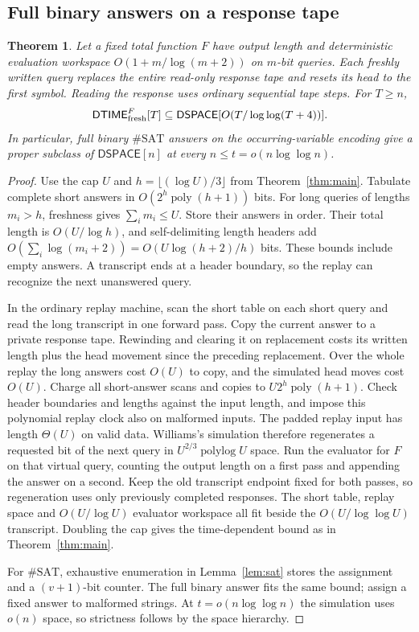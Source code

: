 \documentclass[11pt]{article}
\newtheorem{theorem}{Theorem}[section]
\theoremstyle{remark}
\newcommand{\DTIME}{\mathsf{DTIME}}
\newcommand{\DSPACE}{\mathsf{DSPACE}}
\begin{document}
\subsection{Full binary answers on a response tape}\label{sec:full-answers}
\begin{theorem}\label{thm:full-answers}
Let a fixed total function $F$ have output length and deterministic
evaluation workspace $O(1+m/\log(m+2))$ on $m$-bit queries.
Each freshly written query replaces the entire read-only response
tape and resets its head to the first symbol. Reading the response
uses ordinary sequential tape steps. For $T\ge n$,
\[
 \DTIME_{\rm fresh}^{F}[T]\subseteq
 \DSPACE[O(T/\log\log(T+4))].
\]
In particular, full binary $\#\mathrm{SAT}$ answers on the
occurring-variable encoding give a proper subclass of $\DSPACE[n]$
at every $n\le t=o(n\log\log n)$.
\end{theorem}
\begin{proof}
Use the cap $U$ and $h=\lfloor(\log U)/3\rfloor$ from
Theorem~\ref{thm:main}. Tabulate complete short answers in
$O(2^h\operatorname{poly}(h+1))$ bits. For long queries of lengths
$m_i>h$, freshness gives $\sum_i m_i\le U$. Store their answers
in order. Their total length is $O(U/\log h)$, and self-delimiting
length headers add $O(\sum_i\log(m_i+2))=O(U\log(h+2)/h)$ bits.
These bounds include empty answers. A transcript ends at a header
boundary, so the replay can recognize the next unanswered query.

In the ordinary replay machine, scan the short table on each short
query and read the long transcript in one forward pass. Copy the
current answer to a private response tape. Rewinding and clearing
it on replacement costs its written length plus the head movement
since the preceding replacement. Over the whole replay the long
answers cost $O(U)$ to copy, and the simulated head moves cost $O(U)$.
Charge all short-answer scans and copies to
$U2^h\operatorname{poly}(h+1)$. Check header boundaries and lengths
against the input length, and impose this polynomial replay clock
also on malformed inputs. The padded replay input has length
$\Theta(U)$ on valid data. Williams's simulation therefore regenerates
a requested bit of the next query in $U^{2/3}\operatorname{polylog}U$
space. Run the evaluator for $F$ on that virtual query, counting
the output length on a first pass and appending the answer on a second.
Keep the old transcript endpoint fixed for both passes, so regeneration
uses only previously completed responses. The short table, replay
space and $O(U/\log U)$ evaluator workspace all fit beside the
$O(U/\log\log U)$ transcript. Doubling the cap gives the time-dependent
bound as in Theorem~\ref{thm:main}.

For $\#\mathrm{SAT}$, exhaustive enumeration in Lemma~\ref{lem:sat}
stores the assignment and a $(v+1)$-bit counter. The full binary
answer fits the same bound; assign a fixed answer to malformed strings.
At $t=o(n\log\log n)$ the simulation uses $o(n)$ space, so strictness
follows by the space hierarchy.
\end{proof}
\end{document}
